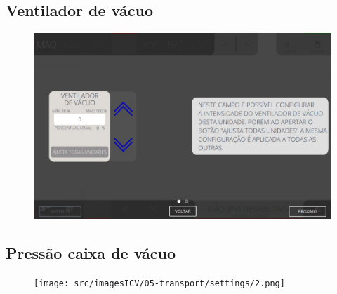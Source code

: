 \thispagestyle{fancy}
\vspace*{40 pt}
\subsection{Ventilador de vácuo}
\vspace*{\fill}
\begin{figure}[h]
    \centering
    \includegraphics[width=480 px,height=300 px]{src/imagesICV/05-transport/settings/1.png}
\end{figure}
\vspace*{\fill}

\newpage
\thispagestyle{fancy}
\vspace*{40 pt}
\subsection{Pressão caixa de vácuo}
\vspace*{\fill}
\begin{figure}[h]
    \centering
    \texttt{[image: src/imagesICV/05-transport/settings/2.png]}
\end{figure}
\vspace*{\fill}
